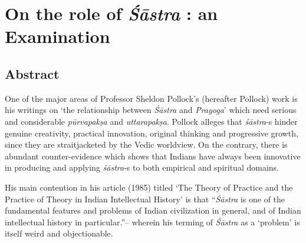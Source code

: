 \chapter{On the role of {\sl\bfseries Śāstra} : an Examination}\label{chapter\thechapter:begin}
\vskip -10pt

\vskip -10pt

\section*{Abstract}

One of the major areas of Professor Sheldon Pollock's (hereafter Pollock) work is his writings on `the relationship between {\it Śāstra} and {\it Prayoga}' which need serious and considerable {\it pūrvapakṣa} and {\it uttarapakṣa}. Pollock alleges that {\it śāstra}-s hinder genuine creativity, practical innovation, original thinking and progressive growth, since they are straitjacketed by the Vedic worldview. On the contrary, there is abundant counter-evidence which shows that Indians have always been innovative in producing and applying {\it śāstra}-s to both empirical and spiritual domains. 

His main contention in his article (1985) titled `The Theory of Practice and the Practice of Theory in Indian Intellectual History' is that ``{\it Śāstra} is one of the fundamental features and problems of Indian civilization in general, and of Indian intellectual history in particular.''-- wherein his terming of {\it Śāstra} as a `problem' is itself weird and objectionable.  

